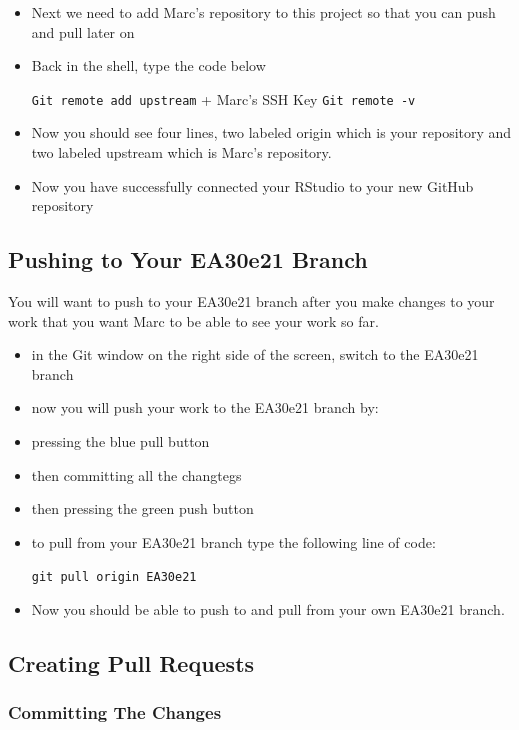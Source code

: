 \documentclass[12pt]{../SOP4_alpha}\usepackage[]{graphicx}\usepackage[]{color}
\begin{document}
\begin{itemize}
    \item Next we need to add Marc's repository to this project so that you can push and pull later on
     

      \item Back in the shell, type the code below
        
        \indent\verb"Git remote add upstream" + Marc's SSH Key
        \indent\verb"Git remote -v"
       
      \item Now you should see four lines, two labeled origin which is your repository and two labeled upstream which is Marc’s repository. 
      \item Now you have successfully connected your RStudio to your new GitHub repository 
\end{itemize}


\subsection {Pushing to Your EA30e21 Branch}
You will want to push to your EA30e21 branch after you make changes to your work that you want Marc to be able to see your work so far. 

\begin{itemize}
  
  \item in the Git window on the right side of the screen, switch to the EA30e21 branch

\item now you will push your work to the EA30e21 branch by:
  \item pressing the blue pull button
  \item then committing all the changtegs
  \item then pressing the green push button
\item to pull from your EA30e21 branch type the following line of code:

  \indent\verb"git pull origin EA30e21"
\item Now you should be able to push to and pull from your own EA30e21 branch.

\end{itemize}


\subsection {Creating Pull Requests}


\subsubsection{Committing The Changes}
\end{document}
